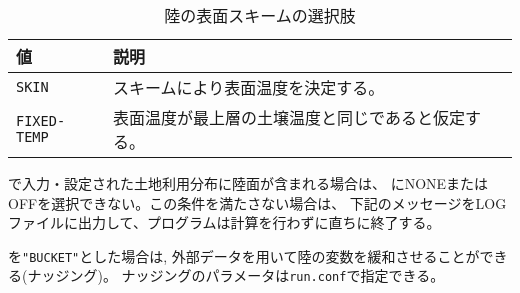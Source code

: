 \begin{table}[hbt]
\begin{center}
  \caption{陸の表面スキームの選択肢}
  \label{tab:nml_land_sfc}
  \begin{tabularx}{150mm}{lX} \hline
    \rowcolor[gray]{0.9}  値 & 説明 \\ \hline
      \verb|SKIN|       & スキームにより表面温度を決定する。 \\
      \verb|FIXED-TEMP| & 表面温度が最上層の土壌温度と同じであると仮定する。 \\
    \hline
  \end{tabularx}
\end{center}
\end{table}

で入力・設定された土地利用分布に陸面が含まれる場合は、
にNONEまたはOFFを選択できない。この条件を満たさない場合は、
下記のメッセージをLOGファイルに出力して、プログラムは計算を行わずに直ちに終了する。

を\verb|"BUCKET"|とした場合は,
外部データを用いて陸の変数を緩和させることができる(ナッジング)。
ナッジングのパラメータは\verb|run.conf|で指定できる。

